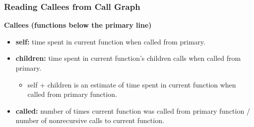 \documentclass[aspectratio=43]{beamer}
\newenvironment{changemargin}[1]{%
  \begin{list}{}{%
    \setlength{\topsep}{0pt}%
    \setlength{\leftmargin}{#1}%
    \setlength{\rightmargin}{1em}
    \setlength{\listparindent}{\parindent}%
    \setlength{\itemindent}{\parindent}%
    \setlength{\parsep}{\parskip}%
  }%
  \item[]}{\end{list}}
\begin{document}
\begin{frame}[fragile]
  \frametitle{Reading Callees from Call Graph}

  \begin{changemargin}{1cm}
  {\bf Callees (functions below the primary line)}
  \begin{itemize}  
    \item {\bf self:} time spent in current function when called from primary.
    \item {\bf children:} time spent in current function's children calls when
      called from primary.
      \begin{itemize}
        \item self + children is an estimate of time spent in current function
          when called from primary function.
      \end{itemize}
    \item {\bf called:} number of times current function was called from primary
      function / number of nonrecursive calls to current function.
  \end{itemize}
  \end{changemargin}
\end{frame}
\end{document}
